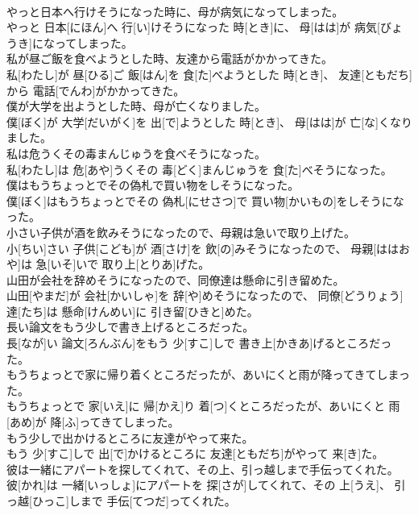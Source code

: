\documentclass[8pt]{extreport}
\begin{document}
\begin{CJK}{UTF8}{min}
\\	やっと日本へ行けそうになった時に、母が病気になってしまった。	
\\	やっと 日本[にほん]へ 行[い]けそうになった 時[とき]に、 母[はは]が 病気[びょうき]になってしまった。
\\	私が昼ご飯を食べようとした時、友達から電話がかかってきた。	
\\	私[わたし]が 昼[ひる]ご 飯[はん]を 食[た]べようとした 時[とき]、 友達[ともだち]から 電話[でんわ]がかかってきた。
\\	僕が大学を出ようとした時、母が亡くなりました。	
\\	僕[ぼく]が 大学[だいがく]を 出[で]ようとした 時[とき]、 母[はは]が 亡[な]くなりました。
\\	私は危うくその毒まんじゅうを食べそうになった。	
\\	私[わたし]は 危[あや]うくその 毒[どく]まんじゅうを 食[た]べそうになった。
\\	僕はもうちょっとでその偽札で買い物をしそうになった。	
\\	僕[ぼく]はもうちょっとでその 偽札[にせさつ]で 買い物[かいもの]をしそうになった。
\\	小さい子供が酒を飲みそうになったので、母親は急いで取り上げた。	
\\	小[ちい]さい 子供[こども]が 酒[さけ]を 飲[の]みそうになったので、 母親[ははおや]は 急[いそ]いで 取り上[とりあ]げた。
\\	山田が会社を辞めそうになったので、同僚達は懸命に引き留めた。	
\\	山田[やまだ]が 会社[かいしゃ]を 辞[や]めそうになったので、 同僚[どうりょう] 達[たち]は 懸命[けんめい]に 引き留[ひきと]めた。
\\	長い論文をもう少しで書き上げるところだった。	
\\	長[なが]い 論文[ろんぶん]をもう 少[すこ]しで 書き上[かきあ]げるところだった。
\\	もうちょっとで家に帰り着くところだったが、あいにくと雨が降ってきてしまった。	
\\	もうちょっとで 家[いえ]に 帰[かえ]り 着[つ]くところだったが、あいにくと 雨[あめ]が 降[ふ]ってきてしまった。
\\	もう少しで出かけるところに友達がやって来た。	
\\	もう 少[すこ]しで 出[で]かけるところに 友達[ともだち]がやって 来[き]た。
\\	彼は一緒にアパートを探してくれて、その上、引っ越しまで手伝ってくれた。	
\\	彼[かれ]は 一緒[いっしょ]にアパートを 探[さが]してくれて、その 上[うえ]、 引っ越[ひっこ]しまで 手伝[てつだ]ってくれた。

\end{CJK}
\end{document}
